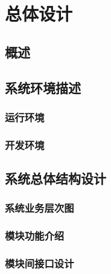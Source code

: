 \section{总体设计}
  
\subsection{概述}


\subsection{系统环境描述}

\subsubsection{运行环境}


\subsubsection{开发环境}


\subsection{系统总体结构设计}

\subsubsection{系统业务层次图}


\subsubsection{模块功能介绍}


\subsubsection{模块间接口设计}
